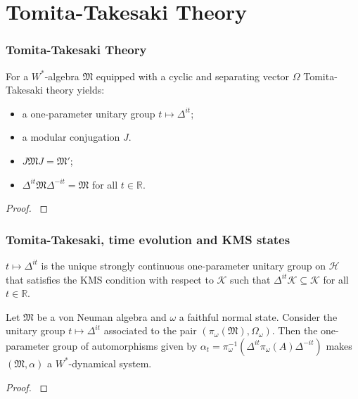 \documentclass{beamer}
\begin{document}
\section{Tomita-Takesaki Theory}

\begin{frame}
	\frametitle{Tomita-Takesaki Theory}
	For a $W^*$-algebra $\mathfrak{M}$ equipped with a cyclic and separating vector $\Omega$ Tomita-Takesaki theory yields:
	\begin{itemize}
		\item a one-parameter unitary group $t\mapsto\Delta^{it}$;
		\item a modular conjugation $J$.
	\end{itemize}
	\begin{theorem}
		\begin{itemize}
			\item $J\mathfrak{M}J=\mathfrak{M}'$;
			\item $\Delta^{it}\mathfrak{M}\Delta^{-it}=\mathfrak{M}$ for all $t\in\mathbb{R}$. 	
		\end{itemize}
	\end{theorem}
	\begin{proof}
		\cite{Duvenhage1999}
	\end{proof}
\end{frame}

\begin{frame}
	\frametitle{Tomita-Takesaki, time evolution and KMS states}
	\begin{theorem}[$\bigstar$]
		$t\mapsto\Delta^{it}$ is the unique strongly continuous one-parameter unitary group on $\mathcal{H}$ that satisfies the KMS condition with respect to $\mathcal{K}$ such that $\Delta^{it}\mathcal{K}\subseteq\mathcal{K}$ for all $t\in\mathbb{R}$.
	\end{theorem}
	\begin{theorem}[$\bigstar$]
		Let $\mathfrak{M}$ be a von Neuman algebra and $\omega$ a faithful normal state. Consider the unitary group $t\mapsto\Delta^{it}$ associated to the pair $(\pi_\omega(\mathfrak{M}),\Omega_\omega)$. Then the one-parameter group of automorphisms given by $\alpha_t = \pi_\omega^{-1}(\Delta^{it}\pi_\omega(A)\Delta^{-it})$ makes $(\mathfrak{M},\alpha)$ a $W^*$-dynamical system.
	\end{theorem}
	\begin{proof}
		\cite{Duvenhage1999}
	\end{proof}
\end{frame}
\end{document}
